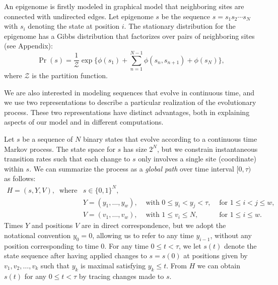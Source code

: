 \documentclass[11pt]{article}
\newcommand\halfopen[2]{\ensuremath{[#1,#2)}}
\begin{document}
An epigenome is firstly modeled in graphical model that neighboring
sites are connected with undirected edges.  Let epigenome $s$ be the
sequence $s=s_1s_2\cdots s_N$ with $s_i$ denoting the state at
position $i$.
The stationary distribution for the epigenome has a Gibbs distribution
that factorizes over pairs of neighboring sites (see Appendix):
\begin{equation}\label{eqn:stationary}
  \Pr(s) = \frac{1}{\mathcal{Z}}\exp\big\{\phi(s_1) +\sum_{n=1}^{N-1}\phi(s_n, s_{n+1}) + \phi(s_N)\big\},
\end{equation}
where $\mathcal{Z}$ is the partition function.

We are also interested in modeling sequences that evolve in continuous
time, and we use two representations to describe a particular
realization of the evolutionary process. These two representations
have distinct advantages, both in explaining aspects of our model and
in different computations.

Let $s$ be a sequence of $N$ binary states that evolve according to a
continuous time Markov process. The state space for $s$ has size
$2^N$, but we constrain instantaneous transition rates such that each
change to $s$ only involves a single site (coordinate) within $s$. We
can summarize the process as a {\it global path} over time interval
$\halfopen{0}{\tau}$ as follows:
\begin{equation}\label{globalJumps}
\begin{array}{llll}
H = (s, Y, V), ~\mbox{ where} & s \in \{0,1\}^N,\\
                              & Y = (y_1, \ldots, y_w), & \mbox{ with } 0 \leq y_i < y_{j} < \tau, & \mbox{ for } 1\leq i < j \leq w,\\
                              & V = (v_1,\ldots, v_w), & \mbox{ with } 1\leq v_i\leq N, & \mbox{ for } 1\leq i \leq w.
\end{array}
\end{equation}
Times $Y$ and positions $V$ are in direct correspondence, but we adopt
the notational convention $y_0 = 0$, allowing us to refer to any time
$y_{i-1}$, without any position corresponding to time $0$.
For any time $0 \leq t < \tau$, we let $s(t)$ denote the state
sequence after having applied changes to $s = s(0)$ at positions given
by $v_1,v_2,\ldots,v_k$ such that $y_k$ is maximal satisfying $y_k
\leq t$. From $H$ we can obtain $s(t)$ for any $0\leq t < \tau$ by
tracing changes made to $s$.
\end{document}

